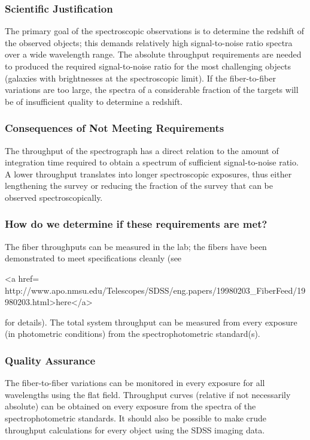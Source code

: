 \subsubsection{Scientific Justification}
 The primary goal of the spectroscopic observations is to determine the
redshift of the observed objects; this demands relatively high signal-to-noise
ratio spectra over a wide wavelength range.  The absolute throughput
requirements are needed to produced the required signal-to-noise ratio
for the most challenging objects (galaxies with brightnesses at the
spectroscopic limit).  If the fiber-to-fiber variations are too large,
the spectra of a considerable fraction of the targets will be of
insufficient quality to determine a redshift.

\subsubsection{Consequences of Not Meeting Requirements}
The throughput of the spectrograph has a direct relation to the amount
of integration time required to obtain a spectrum of sufficient signal-to-noise
ratio.  A lower throughput translates into longer spectroscopic exposures,
thus either lengthening the survey or reducing the fraction of the survey
that can be observed spectroscopically.

\subsubsection{How do we determine if these requirements are met?}

The fiber throughputs can be measured in the lab; the fibers have been
demonstrated to meet specifications cleanly (see 
\begin{rawhtml}
<a href=
http://www.apo.nmsu.edu/Telescopes/SDSS/eng.papers/19980203_FiberFeed/19980203.html>here</a>\end{rawhtml}
for details).   The total system
throughput can be measured from every exposure (in photometric
conditions) from the spectrophotometric standard(s).

\subsubsection{Quality Assurance}
The fiber-to-fiber variations can be monitored in every exposure for
all wavelengths using the flat field.   Throughput curves (relative if not necessarily
absolute) can be obtained on every exposure from the spectra of the
spectrophotometric standards.  It should also be possible to make crude
throughput calculations for every object using the SDSS imaging data.


